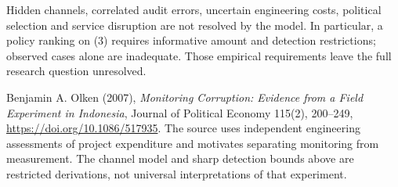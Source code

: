 \documentclass[11pt,a4paper]{article}
\theoremstyle{definition}
\theoremstyle{remark}
\begin{document}
Hidden channels, correlated audit errors, uncertain engineering costs, political selection and service disruption are not resolved by the model. In particular, a policy ranking on (3) requires informative amount and detection restrictions; observed cases alone are inadequate. Those empirical requirements leave the full research question unresolved.

Benjamin A. Olken (2007), \emph{Monitoring Corruption: Evidence from a Field Experiment in Indonesia}, Journal of Political Economy 115(2), 200--249, \url{https://doi.org/10.1086/517935}. The source uses independent engineering assessments of project expenditure and motivates separating monitoring from measurement. The channel model and sharp detection bounds above are restricted derivations, not universal interpretations of that experiment.
\end{document}
